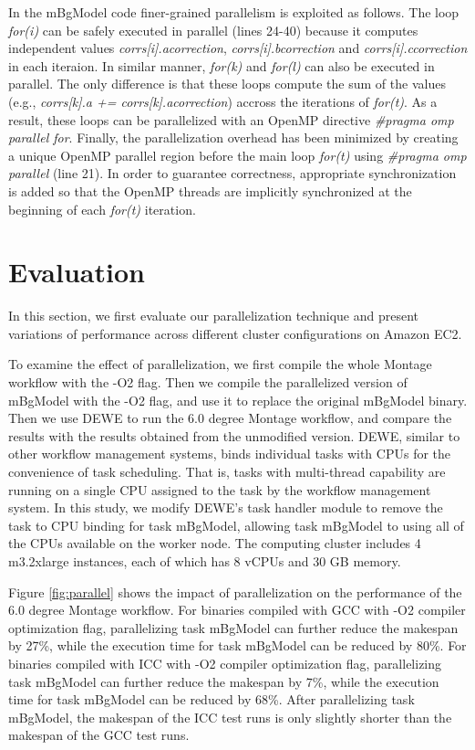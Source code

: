 In the mBgModel code finer-grained parallelism is exploited as follows. The loop {\em for(i)} can be safely executed in parallel (lines 24-40) because it computes independent values {\em corrs[i].acorrection}, {\em corrs[i].bcorrection} and {\em corrs[i].ccorrection} in each iteraion. In similar manner, {\em for(k)} and {\em for(l)} can also be executed in parallel. The only difference is that these loops compute the sum of the values (e.g., {\em corrs[k].a += corrs[k].acorrection}) accross the iterations of {\em for(t)}. As a result, these loops can be parallelized with an OpenMP directive {\em \#pragma omp parallel for}. Finally, the parallelization overhead has been minimized by creating a unique OpenMP parallel region before the main loop {\em for(t)} using {\em \#pragma omp parallel} (line 21). In order to guarantee correctness, appropriate synchronization is added so that the OpenMP threads are implicitly synchronized at the beginning of each {\em for(t)} iteration.


\section{Evaluation}
\label{sec:eval}

In this section, we first evaluate our parallelization technique and present variations of performance across different cluster configurations on Amazon EC2.

To examine the effect of parallelization, we first compile the whole Montage workflow with the -O2 flag. Then we compile the parallelized version of mBgModel with the -O2 flag, and use it to replace the original mBgModel binary. Then we use DEWE to run the 6.0 degree Montage workflow, and compare the results with the results obtained from the unmodified version. DEWE, similar to other workflow management systems, binds individual tasks with CPUs for the convenience of task scheduling. That is, tasks with multi-thread capability are running on a single CPU assigned to the task by the workflow management system. In this study, we modify DEWE's task handler module to remove the task to CPU binding for task mBgModel, allowing task mBgModel to using all of the CPUs available on the worker node. The computing cluster includes 4 m3.2xlarge instances, each of which has 8 vCPUs and 30 GB memory. 

Figure \ref{fig:parallel} shows the impact of parallelization on the performance of the 6.0 degree Montage workflow. For binaries compiled with GCC with -O2 compiler optimization flag, parallelizing task mBgModel can further reduce the makespan by 27\%, while the execution time for task mBgModel can be reduced by 80\%. For binaries compiled with ICC with -O2 compiler optimization flag, parallelizing task mBgModel can further reduce the makespan by 7\%, while the execution time for task mBgModel can be reduced by 68\%. After parallelizing task mBgModel, the makespan of the ICC test runs is only slightly shorter than the makespan of the GCC test runs.


